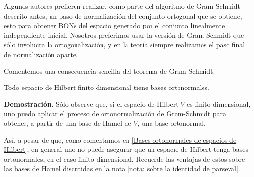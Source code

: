 
\QEDB
\vspace{0.2cm}


\begin{nota}
Algunos autores prefieren realizar, como parte del 
algoritmo de Gram-Schmidt descrito antes, un paso
de normalización del conjunto ortogonal que se obtiene, esto
para obtener BONs del espacio generado por el conjunto
linealmente independiente inicial. Nosotros preferimos
usar la versión de Gram-Schmidt que sólo involucra
la ortogonalización, y en la teoría siempre realizamos
el paso final de normalización aparte.
\end{nota}

Comentemos una consecuencia sencilla del teorema
de Gram-Schmidt. 

\begin{cor}
Todo espacio de Hilbert finito dimensional tiene 
bases ortonormales.
\end{cor}
\noindent
\textbf{Demostración.}
Sólo observe que, si el espacio de
Hilbert $V$ es finito dimensional, uno puedo aplicar
el proceso de ortonormalización de Gram-Schmidt para
obtener, a partir de una base de Hamel de $V$,
una base ortonormal. 
\QEDB
\vspace{0.2cm}

Así, a pesar de que, como comentamos en 
\ref{Bases ortonormales de espacios de Hilbert}, 
en general uno no puede asegurar que un espacio de 
Hilbert tenga bases ortonormales, en el caso finito dimensional.
Recuerde las ventajas
de estos sobre las bases de Hamel discutidas
en la nota \ref{nota: sobre la identidad de parseval}.



